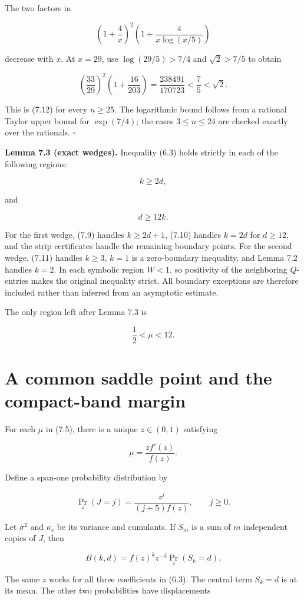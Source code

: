 \documentclass[11pt]{article}
\numberwithin{equation}{section}
\begin{document}
The two factors in

\[
\left(1+\frac4x\right)^2
\left(1+\frac{4}{x\log(x/5)}\right)
\]

decrease with $x$. At $x=29$, use $\log(29/5)>7/4$ and $\sqrt2>7/5$ to obtain

\[
\left(\frac{33}{29}\right)^2
\left(1+\frac{16}{203}\right)
=\frac{238491}{170723}<\frac75<\sqrt2.
\]

This is (7.12) for every $n\ge25$. The logarithmic bound follows from a rational Taylor
upper bound for $\exp(7/4)$; the cases $3\le n\le24$ are checked exactly over the
rationals. $\square$

\textbf{Lemma 7.3 (exact wedges).} Inequality (6.3) holds strictly in each of the following
regions:

\[
k\ge2d,
\tag{7.13}
\]

and

\[
d\ge12k.
\tag{7.14}
\]

For the first wedge, (7.9) handles $k\ge2d+1$, (7.10) handles $k=2d$ for $d\ge12$,
and the strip certificates handle the remaining boundary points. For the second wedge,
(7.11) handles $k\ge3$, $k=1$ is a zero-boundary inequality, and Lemma 7.2 handles
$k=2$. In each symbolic region $W<1$, so positivity of the neighboring $Q$-entries makes
the original inequality strict. All boundary exceptions are therefore included rather than
inferred from an asymptotic estimate.

The only region left after Lemma 7.3 is

\[
\frac12<\mu<12.
\tag{7.15}
\]

\section{A common saddle point and the compact-band margin}


For each $\mu$ in (7.5), there is a unique $z\in(0,1)$ satisfying

\[
\mu=\frac{zf'(z)}{f(z)}.
\tag{8.1}
\]

Define a span-one probability distribution by

\[
\Pr_z(J=j)=\frac{z^j}{(j+5)f(z)},\qquad j\ge0.
\tag{8.2}
\]

Let $\sigma^2$ and $\kappa_s$ be its variance and cumulants. If $S_m$ is a sum of $m$
independent copies of $J$, then

\[
B(k,d)=f(z)^kz^{-d}\Pr_z(S_k=d).
\tag{8.3}
\]

The same $z$ works for all three coefficients in (6.3). The central term $S_k=d$ is at
its mean. The other two probabilities have displacements
\end{document}

